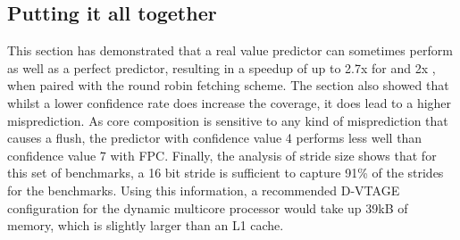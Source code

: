 \subsection{Putting it all together}
This section has demonstrated that a real value predictor can sometimes perform as well as a perfect predictor, resulting in a speedup of up to 2.7x for  and 2x , when paired with the round robin fetching scheme.
The section also showed that whilst a lower confidence rate does increase the coverage, it does lead to a higher misprediction.
As core composition is sensitive to any kind of misprediction that causes a flush, the predictor with confidence value 4 performs less well than confidence value 7 with FPC.
Finally, the analysis of stride size shows that for this set of benchmarks, a 16 bit stride is sufficient to capture 91\% of the strides for the benchmarks.
Using this information, a recommended D-VTAGE configuration for the dynamic multicore processor would take up 39kB of memory, which is slightly larger than an L1 cache.
